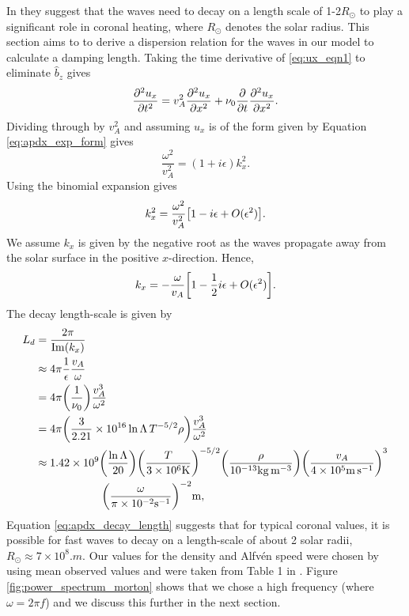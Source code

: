 In \citet{Withbroe1977,Parker1991} they suggest that the waves need to decay on a length scale of 1-2$R_\odot$ to play a significant role in coronal heating, where $R_\odot$ denotes the solar radius. This section aims to to derive a dispersion relation for the waves in our model to calculate a damping length. Taking the time derivative of \eqref{eq:ux_eqn1} to eliminate $\hat{b}_z$ gives
\begin{equation}
    \pdv[2]{u_x}{t} = v_A^2\pdv[2]{u_x}{x} + \nu_0\pdv{}{t}\pdv[2]{u_x}{x}.
\end{equation}
Dividing through by $v_A^2$ and assuming $u_x$ is of the form given by Equation \eqref{eq:apdx_exp_form} gives
\begin{equation}
    \frac{\omega^2}{v_A^2} = (1+i\epsilon)k_x^2.
\end{equation}
Using the binomial expansion gives
\begin{equation}
    k_x^2 = \frac{\omega^2}{v_A^2}\qty[1 -i\epsilon + O(\epsilon^2)].
\end{equation}
We assume $k_x$ is given by the negative root as the waves propagate away from the solar surface in the positive $x$-direction. Hence,
\begin{equation}
    k_x = -\frac{\omega}{v_A}\qty[1 -\frac{1}{2}i\epsilon + O(\epsilon^2)].
\end{equation}
The decay length-scale is given by
\begin{equation}
    \label{eq:apdx_decay_length}
    \begin{aligned}
    L_d &= \frac{2\pi}{\Im(k_x)} \\
    &\approx4\pi\frac{1}{\epsilon}\frac{v_A}{\omega} \\
    &= 4\pi\qty(\frac{1}{\nu_0})\frac{v_A^3}{\omega^2} \\
    &= 4\pi\qty(\frac{3}{2.21}\times10^{16}\ln\Lambda\, T^{-5/2}\rho)\frac{v_A^3}{\omega^2}\\
    &\approx 1.42\times10^9\qty(\frac{\ln \Lambda}{20})\qty(\frac{T}{3\times10^6\si{.K}})^{-5/2}\qty(\frac{\rho}{10^{-13}\si{.kg.m^{-3}}})\qty(\frac{v_A}{4\times10^5\si{.m.s^{-1}}})^3 \\
    &\qquad\qquad\qquad\qty(\frac{\omega}{\pi\times10^{-2}\si{.s^{-1}}})^{-2}\si{.m},
    \end{aligned}
\end{equation}
Equation \eqref{eq:apdx_decay_length} suggests that for typical coronal values, it is possible for fast waves to decay on a length-scale of about 2 solar radii, $R_\odot\approx 7\times10^8\si{.m}$. Our values for the density and Alfv\'en speed were chosen by using mean observed values and were taken from Table 1 in \citet{Morton2016}. Figure \ref{fig:power_spectrum_morton} shows that we chose a high frequency (where $\omega= 2\pi f$) and we discuss this further in the next section.

